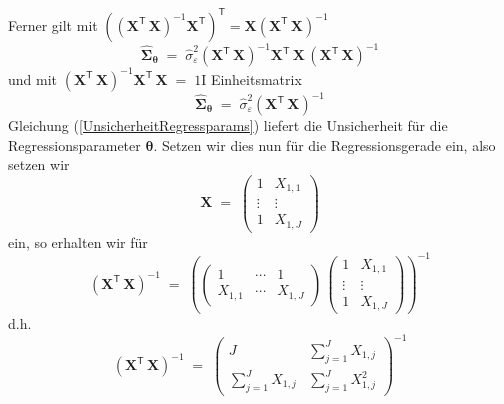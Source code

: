 Ferner gilt mit $\left( \left( \mathbf{X}^\mathsf{T}  \, \mathbf{X} \right)^{-1} \mathbf{X}^\mathsf{T} \right)^\mathsf{T} = \mathbf{X} \left( \mathbf{X}^\mathsf{T}  \, \mathbf{X} \right)^{-1}$
\begin{equation}
\boldsymbol{\hat \Sigma}_{\boldsymbol{\theta}} \; = \; \hat \sigma_{\varepsilon}^2
\left( \mathbf{X}^\mathsf{T}  \, \mathbf{X} \right)^{-1} \mathbf{X}^\mathsf{T}  \,  \mathbf{X} \, \left( \mathbf{X}^\mathsf{T}  \, \mathbf{X} \right)^{-1}
\end{equation}
und mit $\left( \mathbf{X}^\mathsf{T}  \, \mathbf{X} \right)^{-1} \mathbf{X}^\mathsf{T}  \, \mathbf{X}  \; = \; 1 \! \mathrm{I}$ Einheitsmatrix
\begin{equation}
\boldsymbol{\hat \Sigma}_{\boldsymbol{\theta}} \; = \; \hat \sigma_{\varepsilon}^2
\left( \mathbf{X}^\mathsf{T}  \, \mathbf{X} \right)^{-1}
\label{UnsicherheitRegressparams}
\end{equation}
Gleichung (\ref{UnsicherheitRegressparams}) liefert die Unsicherheit für die Regressionsparameter
$\boldsymbol{\theta}$.
Setzen wir dies nun für die Regressionsgerade ein, also setzen wir
$$
\mathbf{X} \; = \;
\left(
\begin{array}{cc}
1 &  X_{1,1} \\
\vdots & \vdots\\
1 & X_{1,J}
\end{array}
\right)
$$
ein, so erhalten wir für
\begin{equation}
\left( \mathbf{X}^\mathsf{T}  \, \mathbf{X} \right)^{-1} \; = \;
\left( \left(
\begin{array}{ccc}
1 & \cdots & 1 \\
X_{1,1} & \cdots & X_{1,J}
\end{array}
\right)
\,
\left(
\begin{array}{cc}
1 &  X_{1,1} \\
\vdots & \vdots\\
1 & X_{1,J}
\end{array}
\right) \right)^{-1}
\end{equation}
d.h.
\begin{equation}
\left( \mathbf{X}^\mathsf{T}  \, \mathbf{X} \right)^{-1} \; = \;
\left(
\begin{array}{ccc}
J & \sum\limits_{j=1}^J X_{1,j} \\
\sum\limits_{j=1}^J X_{1,j} & \sum\limits_{j=1}^J X_{1,j}^2
\end{array}
\right)^{-1}
\end{equation}
